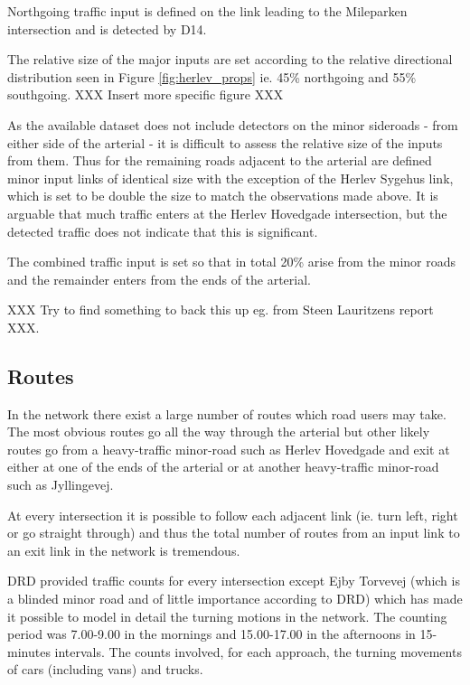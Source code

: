 Northgoing traffic input is defined on the link leading to the Mileparken intersection and is detected by D14. 

The relative size of the major inputs are set according to the relative directional distribution seen in Figure \ref{fig:herlev_props} ie. 45\% northgoing and 55\% southgoing. XXX Insert more specific figure XXX

As the available dataset does not include detectors on the minor sideroads - from either side of the arterial - it is difficult to assess the relative size of the inputs from them. Thus for the remaining roads adjacent to the arterial are defined minor input links of identical size with the exception of the Herlev Sygehus link, which is set to be double the size to match the observations made above.
It is arguable that much traffic enters at the Herlev Hovedgade intersection, but the detected traffic does not indicate that this is significant.

The combined traffic input is set so that in total 20\% arise from the minor roads and the remainder enters from the ends of the arterial. 

XXX Try to find something to back this up eg. from Steen Lauritzens report XXX.

\subsection{Routes}
\label{routefractions}
In the network there exist a large number of routes which road users may take. The most obvious routes go all the way through the arterial but other likely routes go from a heavy-traffic minor-road such as Herlev Hovedgade and exit at either at one of the ends of the arterial or at another heavy-traffic minor-road such as Jyllingevej.

At every intersection it is possible to follow each adjacent link (ie. turn left, right or go straight through) and thus the total number of routes from an input link to an exit link in the network is tremendous.

DRD provided traffic counts for every intersection except Ejby Torvevej (which is a blinded minor road and of little importance according to DRD) which has made it possible to model in detail the turning motions in the network.
The counting period was 7.00-9.00 in the mornings and 15.00-17.00 in the afternoons in 15-minutes intervals. The counts involved, for each approach, the turning movements of cars (including vans) and trucks. 

